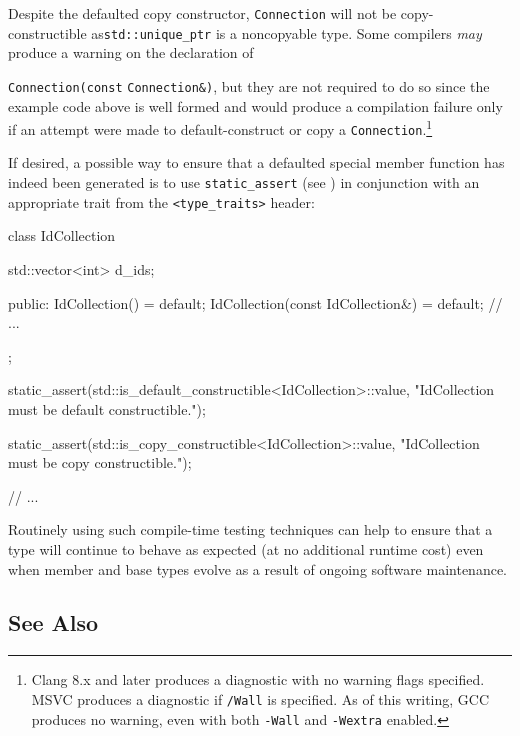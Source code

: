 \noindent Despite the defaulted copy constructor, \lstinline!Connection! will not be
copy-constructible as\linebreak[4] \lstinline!std::unique_ptr! is a noncopyable type.
Some compilers \emph{may} produce a warning on the declaration of
{\lstinline!Connection(const! \lstinline!Connection&)!, but they are not
required to do so since the example code above is well formed and would produce a
compilation failure only if an attempt were made to default-construct or
copy a \lstinline!Connection!.{\cprotect\footnote{Clang 8.x
and later produces a diagnostic with no warning flags specified.
MSVC produces a diagnostic if \lstinline!/Wall! is specified. As of this writing, GCC produces no warning, even with both
  \lstinline!-Wall! and \lstinline!-Wextra! enabled.}}

If desired, a possible way to ensure that a defaulted special member
function has indeed been generated is to use
{\lstinline!static_assert!} (see )
in conjunction with an
appropriate trait from the \lstinline!<type_traits>! header:

\begin{emcppslisting}[language=C++]
class IdCollection
{
    std::vector<int> d_ids;

public:
    IdCollection() = default;
    IdCollection(const IdCollection&) = default;
    // ...
};

static_assert(std::is_default_constructible<IdCollection>::value,
              "IdCollection must be default constructible.");

static_assert(std::is_copy_constructible<IdCollection>::value,
              "IdCollection must be copy constructible.");

// ...
\end{emcppslisting}

\noindent Routinely using such compile-time testing techniques can help to ensure
that a type will continue to behave as expected (at no additional
runtime cost) even when member and base types evolve as a result
of ongoing software maintenance.

\subsection[See Also]{See Also}\label{see-also}

}

